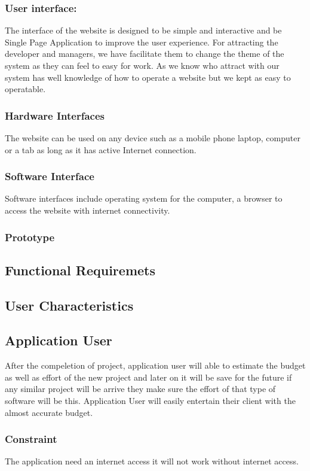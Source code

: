     \subsubsection{User interface: }
    The interface of the website is designed to be simple and interactive and be Single Page Application to improve the user experience. 
    For attracting the developer and managers, we have facilitate them to change the theme of the system as they can feel to easy for work.
    As we know who attract with our system has well knowledge of how to operate a website but we kept as easy to operatable.
    \subsubsection{Hardware Interfaces}
    The website can be used on any device such as a mobile phone laptop, computer or a tab as long as it has active Internet connection.
    \subsubsection{Software Interface}
    Software interfaces include operating system for the computer, a browser to access the website with internet connectivity.
    \subsubsection{Prototype}
    
    
    \subsection{Functional Requiremets}
    
    


\subsection{User Characteristics}
\subsection*{Application User}
After the compeletion of project, application user will able to estimate the budget as well as effort of the new project and later on it will be save for the future if any similar project will be arrive they make sure the effort of that type of software will be this.
Application User will easily entertain their client with the almost accurate budget. 
\subsubsection{Constraint}
The application need an internet access it will not work without internet access.
